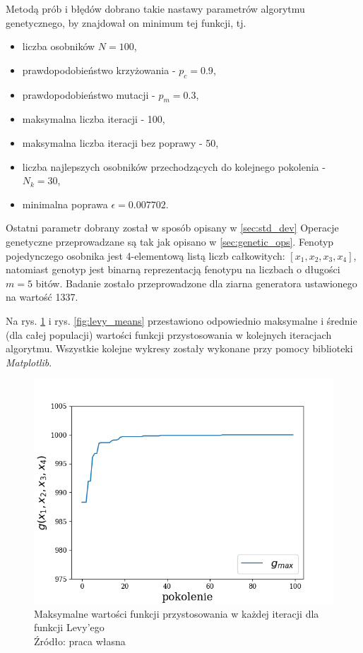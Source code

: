 Metodą prób i błędów dobrano takie nastawy parametrów algorytmu genetycznego, by znajdował on minimum tej funkcji, tj.
\begin{itemize}
  \item liczba osobników $N = 100$,
  \item prawdopodobieństwo krzyżowania - $p_{c} = 0.9$,
  \item prawdopodobieństwo mutacji - $p_{m} = 0.3$,
  \item maksymalna liczba iteracji - 100,
  \item maksymalna liczba iteracji bez poprawy - 50,
  \item liczba najlepszych osobników przechodzących do kolejnego pokolenia - $ N_{k} = 30$,
  \item minimalna poprawa $\epsilon = 0.007702$.
\end{itemize}

Ostatni parametr dobrany został w sposób opisany w \ref{sec:std_dev}
Operacje genetyczne przeprowadzane są tak jak opisano w \ref{sec:genetic_ops}.
Fenotyp pojedynczego osobnika jest 4-elementową listą liczb całkowitych: $[ x_1, x_2, x_3, x_4]$, natomiast genotyp jest binarną reprezentacją fenotypu na liczbach o długości $m=5$ bitów.
Badanie zostało przeprowadzone dla ziarna generatora ustawionego na wartość 1337.

Na rys. \ref{fig:levy_maxes} i rys. \ref{fig:levy_means} przestawiono odpowiednio maksymalne i średnie (dla całej populacji) wartości funkcji przystosowania w kolejnych iteracjach algorytmu.
Wszystkie kolejne wykresy zostały wykonane przy pomocy biblioteki \textit{Matplotlib}. \cite{Hunter:2007}

\begin{figure}[h!tb]
	 \centering
	 \includegraphics[width = 0.85\linewidth]{img/levy_maxes}
	 \caption{Maksymalne wartości funkcji przystosowania w każdej iteracji dla funkcji Levy'ego \\
              Źródło: praca własna}
	 \label{fig:levy_maxes}
\end{figure}

